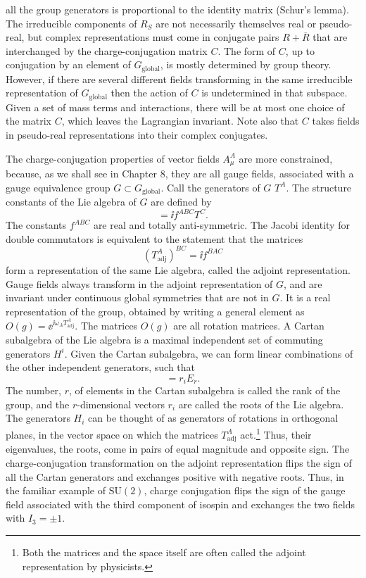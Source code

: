 all the group generators is proportional to the identity matrix (Schur’s lemma). The
irreducible components of $R_S$ are not necessarily themselves real or pseudo-real, but
complex representations must come in conjugate pairs $R+\overline R$ that are interchanged by
the charge-conjugation matrix $C$. The form of $C$, up to conjugation by an element of
$G_{\mathrm{global}}$, is mostly determined by group theory. However, if there are several different
fields transforming in the same irreducible representation of $G_{\mathrm{global}}$ then the action of
$C$ is undetermined in that subspace. Given a set of mass terms and interactions, there
will be at most one choice of the matrix $C$, which leaves the Lagrangian invariant. Note
also that $C$ takes fields in pseudo-real representations into their complex conjugates.

The charge-conjugation properties of vector fields $A^A_\mu$ are more constrained, because,
as we shall see in Chapter 8, they are all gauge fields, associated with a gauge equivalence
group $G\subset G_{\mathrm{global}}$. Call the generators of $G$ $T^A$. The structure constants of the Lie
algebra of $G$ are defined by
\begin{equation*}
  [T^A,T^B]=\ii f^{ABC}T^C.
\end{equation*}
The constants $f^{ABC}$ are real and totally anti-symmetric. The Jacobi identity for double
commutators is equivalent to the statement that the matrices
\begin{equation*}
  (T_{\mathrm{adj}}^A)^{BC}=\ii f^{BAC}
\end{equation*}
form a representation of the same Lie algebra, called the adjoint representation. Gauge
fields always transform in the adjoint representation of $G$, and are invariant under
continuous global symmetries that are not in $G$. It is a real representation of the group,
obtained by writing a general element as $O(g)=\ee^{\ii\omega_A T_{\mathrm{adj}}^A}$. The matrices $O(g)$ are all
rotation matrices. A Cartan subalgebra of the Lie algebra is a maximal independent
set of commuting generators $H^i$. Given the Cartan subalgebra, we can form linear
combinations of the other independent generators, such that
\begin{equation*}
  [H_i,E_r]=r_iE_r.
\end{equation*}
The number, $r$, of elements in the Cartan subalgebra is called the rank of the group,
and the $r$-dimensional vectors $r_i$ are called the roots of the Lie algebra. The generators
$H_i$ can be thought of as generators of rotations in orthogonal planes, in the vector
space on which the matrices $T_{\mathrm{adj}}^A$ act.\footnote[9]{Both the matrices and the space itself are often called the adjoint representation by physicists.}
Thus, their eigenvalues, the roots, come in pairs
of equal magnitude and opposite sign. The charge-conjugation transformation on the
adjoint representation flips the sign of all the Cartan generators and exchanges positive
with negative roots. Thus, in the familiar example of $\mathrm{SU}(2)$, charge conjugation flips
the sign of the gauge field associated with the third component of isospin and exchanges
the two fields with $I_3=\pm1$.

